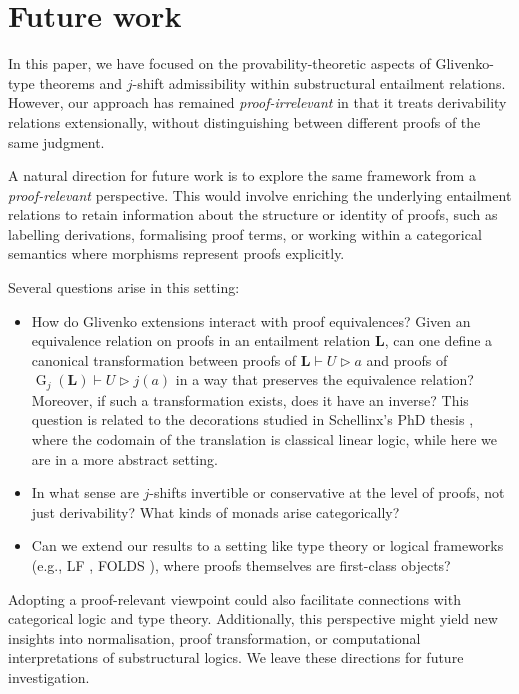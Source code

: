 \documentclass[runningheads]{llncs}
\renewcommand{\L}{\mathbf{L}}
\DeclareMathOperator{\Glivenko}{G}
\begin{document}
\section{Future work}

In this paper, we have focused on the provability-theoretic aspects of Glivenko-type theorems and $j$-shift admissibility within substructural entailment relations. However, our approach has remained \emph{proof-irrelevant} in that it treats derivability relations extensionally, without distinguishing between different proofs of the same judgment.

A natural direction for future work is to explore the same framework from a \emph{proof-relevant} perspective. This would involve enriching the underlying entailment relations to retain information about the structure or identity of proofs, such as labelling derivations, formalising proof terms, or working within a categorical semantics where morphisms represent proofs explicitly.

Several questions arise in this setting:
\begin{itemize}
    \item How do Glivenko extensions interact with proof equivalences? Given an equivalence relation on proofs in an entailment relation $\L$, can one define a canonical transformation between proofs of $\L \vdash U \rhd a$ and proofs of $\Glivenko_j(\L) \vdash U \rhd j(a)$ in a way that preserves the equivalence relation? Moreover, if such a transformation exists, does it have an inverse? This question is related to the decorations studied in Schellinx's PhD thesis \cite{schellinx1994noble}, where the codomain of the translation is classical linear logic, while here we are in a more abstract setting.
    \item In what sense are $j$-shifts invertible or conservative at the level of proofs, not just derivability? What kinds of monads arise categorically?
    \item Can we extend our results to a setting like type theory or logical frameworks (e.g., LF \cite{HarperLF87}, FOLDS \cite{makkai1998towards}), where proofs themselves are first-class objects?
\end{itemize}

Adopting a proof-relevant viewpoint could also facilitate connections with categorical logic and type theory. Additionally, this perspective might yield new insights into normalisation, proof transformation, or computational interpretations of substructural logics.
We leave these directions for future investigation.
\end{document}
